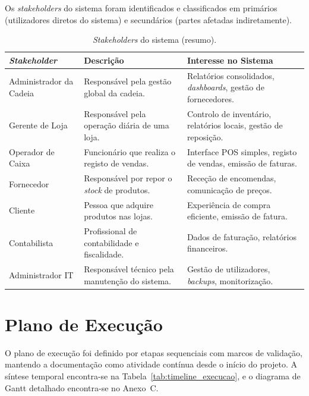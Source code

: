     Os \textit{stakeholders} do sistema foram identificados e classificados em primários (utilizadores diretos do sistema) e secundários (partes afetadas indiretamente).

    \begin{table}[H]
    \centering
    \small
    \begin{tabular}{|>{\centering\arraybackslash}m{3.5cm}|>{\raggedright\arraybackslash}m{5cm}|>{\raggedright\arraybackslash}m{5.5cm}|}
    \hline
    \textbf{\textit{Stakeholder}} & \textbf{Descrição} & \textbf{Interesse no Sistema} \\
    \hline
    Administrador da Cadeia & Responsável pela gestão global da cadeia. & Relatórios consolidados, \textit{dashboards}, gestão de fornecedores. \\
    \hline
    Gerente de Loja & Responsável pela operação diária de uma loja. & Controlo de inventário, relatórios locais, gestão de reposição. \\
    \hline
    Operador de Caixa & Funcionário que realiza o registo de vendas. & Interface POS simples, registo de vendas, emissão de faturas. \\
    \hline
    Fornecedor & Responsável por repor o \textit{stock} de produtos. & Receção de encomendas, comunicação de preços. \\
    \hline
    Cliente & Pessoa que adquire produtos nas lojas. & Experiência de compra eficiente, emissão de fatura. \\
    \hline
    Contabilista & Profissional de contabilidade e fiscalidade. & Dados de faturação, relatórios financeiros. \\
    \hline
    Administrador IT & Responsável técnico pela manutenção do sistema. & Gestão de utilizadores, \textit{backups}, monitorização. \\
    \hline
    \end{tabular}
    \caption{\textit{Stakeholders} do sistema (resumo).}
    \label{tab:stakeholders_resumo}
    \end{table}

\section{Plano de Execução}

O plano de execução foi definido por etapas sequenciais com marcos de validação, mantendo a documentação como atividade contínua desde o início do projeto. A síntese temporal encontra-se na Tabela~\ref{tab:timeline_execucao}, e o diagrama de Gantt detalhado encontra-se no Anexo~C.

